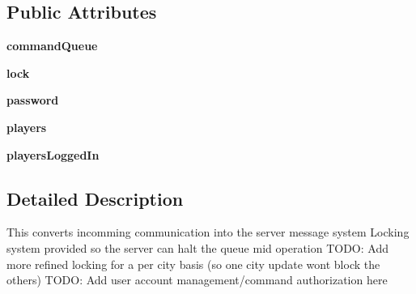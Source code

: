 \subsection*{Public Attributes}
\begin{DoxyCompactItemize}
\item 
\hypertarget{classserver_1_1CommandProcessor_aea36aa623b8a0882b4f323db165394be}{
{\bfseries commandQueue}}
\label{classserver_1_1CommandProcessor_aea36aa623b8a0882b4f323db165394be}

\item 
\hypertarget{classserver_1_1CommandProcessor_ae22edb4ff4f1f2a8902994ec325041c3}{
{\bfseries lock}}
\label{classserver_1_1CommandProcessor_ae22edb4ff4f1f2a8902994ec325041c3}

\item 
\hypertarget{classserver_1_1CommandProcessor_a9013d3dcf56098db2da38580ae81e11e}{
{\bfseries password}}
\label{classserver_1_1CommandProcessor_a9013d3dcf56098db2da38580ae81e11e}

\item 
\hypertarget{classserver_1_1CommandProcessor_aa3c8c2789ff3be6af3e58cf5c0610073}{
{\bfseries players}}
\label{classserver_1_1CommandProcessor_aa3c8c2789ff3be6af3e58cf5c0610073}

\item 
\hypertarget{classserver_1_1CommandProcessor_ab06bf4b2c6aa6b2e3c76f69707882f8c}{
{\bfseries playersLoggedIn}}
\label{classserver_1_1CommandProcessor_ab06bf4b2c6aa6b2e3c76f69707882f8c}

\end{DoxyCompactItemize}


\subsection{Detailed Description}
\begin{DoxyVerb}
This converts incomming communication into the server message system
Locking system provided so the server can halt the queue mid operation
TODO: Add more refined locking for a per city basis (so one city update wont block the others)
TODO: Add user account management/command authorization here
\end{DoxyVerb}
 

